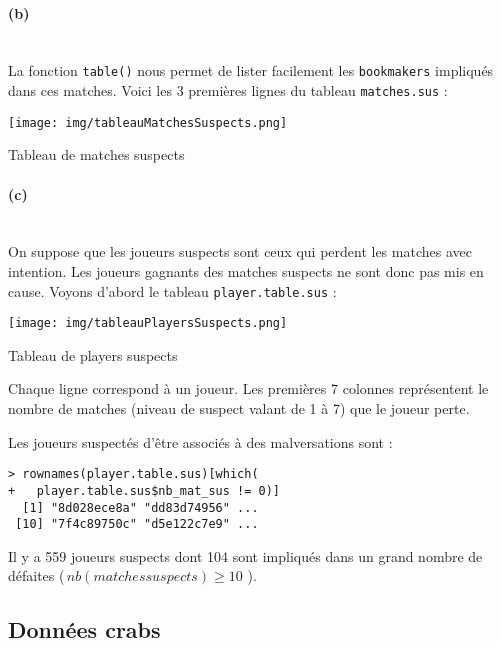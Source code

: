 \documentclass{article}
\begin{document}
\begin{multicols}{2}
    \paragraph{(b)}
    ~\\
    La fonction \verb|table()| nous permet de lister facilement les \verb|bookmakers| impliqués dans ces matches. Voici les 3 premières lignes du tableau \verb|matches.sus| :
    \begin{table}[H]
  		\centering
  		\texttt{[image: img/tableauMatchesSuspects.png]}
  		\label{tab: Tableau de matches suspects}
    	\caption{Tableau de matches suspects}
    \end{table}

    
	\paragraph{(c)}
	~\\
	On suppose que les joueurs suspects sont ceux qui perdent les matches avec intention. Les joueurs gagnants des matches suspects ne sont donc pas mis en cause. Voyons d'abord le tableau \verb|player.table.sus| :
	\begin{table}[H]
		\centering
		\texttt{[image: img/tableauPlayersSuspects.png]}
		\label{tab: Tableau de players suspects}
		\caption{Tableau de players suspects}
	\end{table}
	Chaque ligne correspond à un joueur. Les premières 7 colonnes représentent le nombre de matches (niveau de suspect valant de 1 à 7) que le joueur perte. 
	
	Les joueurs suspectés d'être associés à des malversations sont : 
\begin{mdframed}
\begin{footnotesize}
	\begin{Verbatim}
> rownames(player.table.sus)[which(
+   player.table.sus$nb_mat_sus != 0)]
  [1] "8d028ece8a" "dd83d74956" ...
 [10] "7f4c89750c" "d5e122c7e9" ...
	\end{Verbatim}
\end{footnotesize}
\end{mdframed}
	Il y a 559 joueurs suspects dont 104 sont impliqués dans un grand nombre de défaites ($\,nb(matches suspects)\geqslant10$ ).
	
	
	    
   	\subsection{Données crabs}

\end{multicols}
\end{document}
